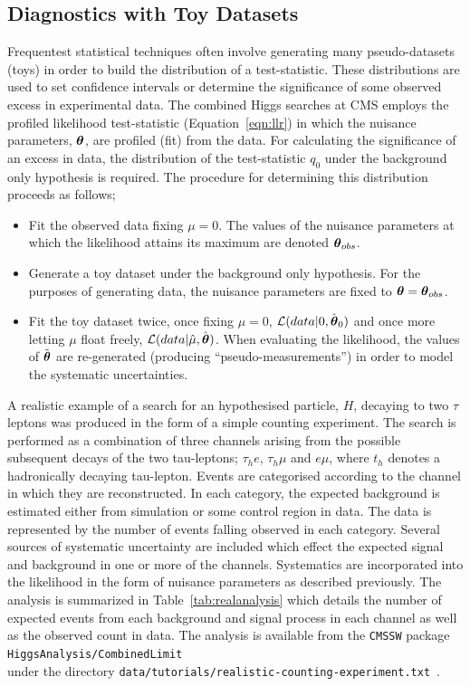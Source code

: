 \subsection{Diagnostics with Toy Datasets}
Frequentest statistical techniques often involve generating many pseudo-datasets (toys)
in order to build the distribution of a test-statistic. 
These distributions are used to set confidence intervals or determine the significance of
some observed excess in experimental data. The combined Higgs searches at CMS employs the
profiled likelihood test-statistic (Equation~\ref{eqn:llr}) in which the nuisance parameters,
${\boldsymbol{\theta}}$, are profiled (fit) from the data. 
For calculating the significance of an excess in data, the distribution
of the test-statistic $q_{0}$ under the background only hypothesis is required. 
The procedure for determining this distribution proceeds as follows;

\begin{itemize}
\item{Fit the observed data fixing $\mu=0$. The values of the nuisance parameters 
at which the likelihood attains its maximum are denoted ${\boldsymbol{\theta}}_{obs}$.}
\item{Generate a toy dataset under the background only hypothesis. For the purposes of
generating data, the nuisance parameters are fixed to ${\boldsymbol{\theta}}={\boldsymbol{\theta}}_{obs}$.}
\item{Fit the toy dataset twice, once fixing $\mu=0$, $\mathcal{L}(data|0,\hat{{\boldsymbol{\theta}}}_{0})$ 
and once more letting 
$\mu$ float freely, $\mathcal{L}(data|\hat{\mu},\hat{{\boldsymbol{\theta}}})$. When 
evaluating the likelihood, the values of $\tilde{{\boldsymbol{\theta}}}$ are re-generated 
(producing ``pseudo-measurements'') in order to model the systematic uncertainties.}
\end{itemize}

A realistic example of a search for an hypothesised particle, $H$, 
decaying to two $\tau$ leptons was produced in the form 
of a simple counting experiment. The search is performed as a combination of 
three channels arising from the possible subsequent 
decays of the two tau-leptons; $\tau_{h}e$, $\tau_{h}\mu$ and $e\mu$, where $t_{h}$
denotes a hadronically decaying tau-lepton. 
Events are categorised according to the channel in which they are reconstructed.
In each category, the expected background is estimated
either from simulation or some control region in data. 
The data is represented by the number of events falling observed in each category.
Several sources of systematic uncertainty are included which effect the
expected signal and background in one or more of the channels. 
Systematics are incorporated into the likelihood in the form of nuisance 
parameters as described previously. The analysis is summarized in 
Table~\ref{tab:realanalysis} which details the number of expected events 
from each background and signal process in each channel as well as the 
observed count in data. 
The analysis is available from the \texttt{CMSSW} package \texttt{HiggsAnalysis/CombinedLimit}\\
under the directory \texttt{data/tutorials/realistic-counting-experiment.txt}~\citep{null}.

